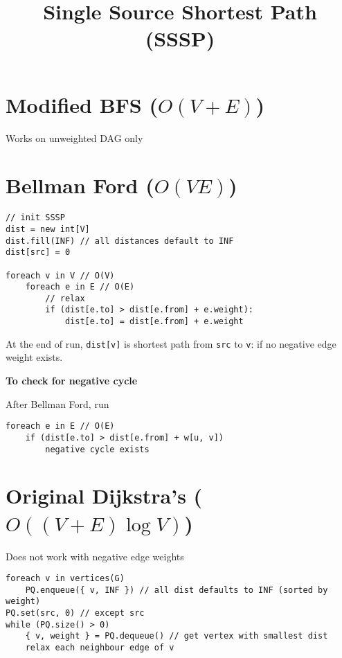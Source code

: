 \documentclass[12pt]{article}
\title{\textbf{Single Source Shortest Path (SSSP)}}
\date{}
\begin{document}
\maketitle

\begin{spacing}{1.5}

\section{Modified BFS ($O(V+E)$)}

Works on unweighted DAG only

\section{Bellman Ford ($O(VE)$)}

\begin{verbatim}
// init SSSP
dist = new int[V]
dist.fill(INF) // all distances default to INF
dist[src] = 0

foreach v in V // O(V)
    foreach e in E // O(E)
        // relax
        if (dist[e.to] > dist[e.from] + e.weight): 
            dist[e.to] = dist[e.from] + e.weight
\end{verbatim}

At the end of run, \texttt{dist[v]} is shortest path from \texttt{src} to \texttt{v}: if no negative edge weight exists. 

\textbf{To check for negative cycle}

After Bellman Ford, run 

\begin{verbatim}
foreach e in E // O(E)
    if (dist[e.to] > dist[e.from] + w[u, v])
        negative cycle exists 
\end{verbatim}

\section{Original Dijkstra's ($O((V+E) \log{V})$)}

Does not work with negative edge weights

\begin{verbatim}
foreach v in vertices(G)
    PQ.enqueue({ v, INF }) // all dist defaults to INF (sorted by weight)
PQ.set(src, 0) // except src
while (PQ.size() > 0)
    { v, weight } = PQ.dequeue() // get vertex with smallest dist
    relax each neighbour edge of v 
\end{verbatim}



\end{spacing}
\end{document}
